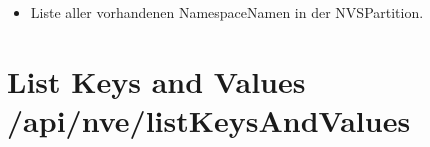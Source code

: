 \documentclass[letterpaper,10pt,english]{sphinxmanual}
\begin{document}
\begin{sphinxVerbatim}[commandchars=\\\{\}]
\PYG{p}{[}
\PYG{p}{]}
\end{sphinxVerbatim}

\sphinxAtStartPar
{}
\begin{itemize}
\item {} 
\sphinxAtStartPar
{}  \textendash{} Liste aller vorhandenen Namespace\sphinxhyphen{}Namen in der NVS\sphinxhyphen{}Partition.

\end{itemize}


\section{List Keys and Values \textendash{} /api/nve/listKeysAndValues}
\label{\detokenize{agv_rest_api_nve:list-keys-and-values-api-nve-listkeysandvalues}}\label{\detokenize{agv_rest_api_nve:post-api-nve-listkeysandvalues}}
\end{document}
